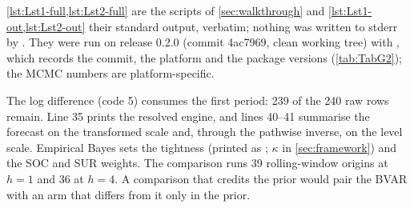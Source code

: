 \cref{lst:Lst1-full,lst:Lst2-full} are the scripts of \cref{sec:walkthrough} and
\cref{lst:Lst1-out,lst:Lst2-out} their standard output, verbatim; nothing was written to stderr by
.
They were run on release 0.2.0 (commit 4ac7969, clean working tree) with
, which records the commit, the platform and the package
versions (\cref{tab:TabG2}); the MCMC numbers are platform-specific.




The log difference (code 5) consumes the first period: 239 of the 240 raw rows remain.
Line 35 prints the resolved engine, and lines 40--41 summarise the forecast on the transformed
scale and, through the pathwise inverse, on the level scale.
Empirical Bayes sets the tightness (printed as ; $\kappa$ in \cref{sec:framework})
and the SOC and SUR weights.
The comparison runs 39 rolling-window origins at $h = 1$ and 36 at $h = 4$.
A comparison that credits the prior would pair the BVAR with an arm that differs from it only in
the prior.




